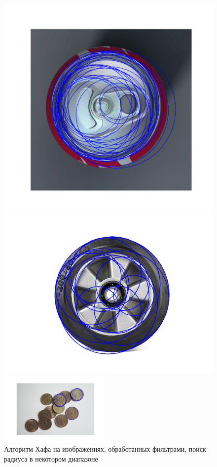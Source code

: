\documentclass[a4paper,12pt]{article}
\begin{document}
\begin{figure}[H]
    \centering
    \begin{minipage}{0.48\textwidth}
        \centering
        \includegraphics[width=\textwidth]{images/hough_circles/1_proc_range.png}
    \end{minipage}
    \begin{minipage}{0.48\textwidth}
        \centering
        \includegraphics[width=\textwidth]{images/hough_circles/3_proc_range.png}
    \end{minipage}
    \includegraphics[width=0.48\textwidth]{images/hough_circles/2_proc_range.png}
    \caption{Алгоритм Хафа на изображениях, обработанных фильтрами, поиск радиуса в некотором диапазоне}
\end{figure}
\end{document}
